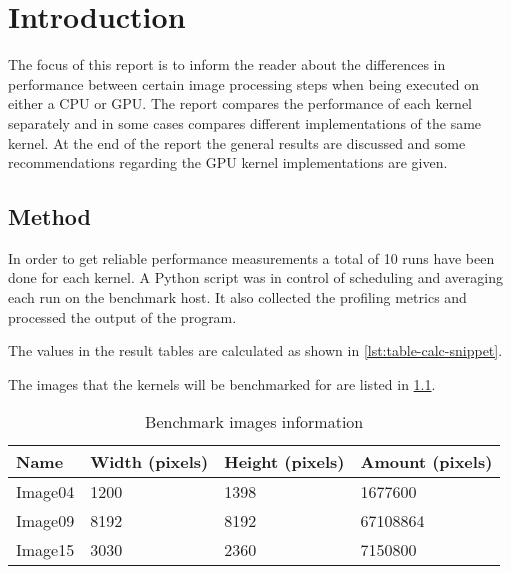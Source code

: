 \documentclass[final]{report}
\begin{document}
\chapter{Introduction}

The focus of this report is to inform the reader about the differences in performance between certain image processing steps when being executed on either a CPU or GPU.
The report compares the performance of each kernel separately and in some cases compares different implementations of the same kernel.
At the end of the report the general results are discussed and some recommendations regarding the GPU kernel implementations are given.

\section{Method}
In order to get reliable performance measurements a total of 10 runs have been done for each kernel.
A Python script was in control of scheduling and averaging each run on the benchmark host.
It also collected the profiling metrics and processed the output of the program.

The values in the result tables are calculated as shown in \cref{lst:table-calc-snippet}.


The images that the kernels will be benchmarked for are listed in \cref{tab:image-information}.

\begin{table}[H]
	\centering
	\caption{Benchmark images information}
	\label{tab:image-information}
	\begin{tabular}{llll}
		\toprule
			\textbf{Name} &\textbf{Width (pixels)} & \textbf{Height (pixels)} & \textbf{Amount (pixels)}\\
		\midrule
			Image04 & 1200				& 1398				& 1677600 \\
			Image09 & 8192 				& 8192 				& 67108864 \\
			Image15 & 3030 				& 2360 				& 7150800\\
		\bottomrule
	\end{tabular}
\end{table}

\end{document}
